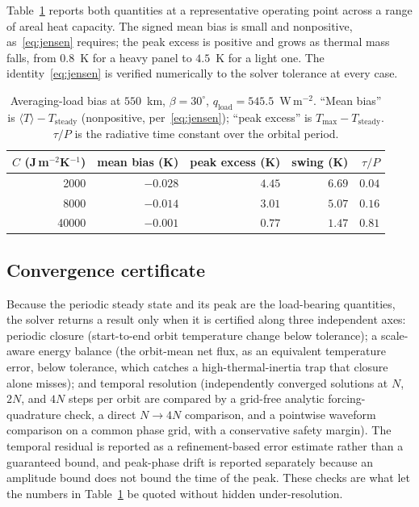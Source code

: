 \documentclass[11pt]{article}
\theoremstyle{remark}
\begin{document}
Table~\ref{tab:bias} reports both quantities at a representative operating point
across a range of areal heat capacity. The signed mean bias is small and
nonpositive, as~\eqref{eq:jensen} requires; the peak excess is positive and grows
as thermal mass falls, from $0.8$~K for a heavy panel to $4.5$~K for a light one.
The identity~\eqref{eq:jensen} is verified numerically to the solver tolerance at
every case.

\begin{table}[t]
\centering
\caption{Averaging-load bias at $550$~km, $\beta=30^{\circ}$,
$q_{\mathrm{load}}=545.5$~W\,m$^{-2}$. ``Mean bias'' is
$\langle T\rangle - T_{\mathrm{steady}}$ (nonpositive, per~\eqref{eq:jensen});
``peak excess'' is $T_{\max}-T_{\mathrm{steady}}$. $\tau/P$ is the radiative time
constant over the orbital period.}
\label{tab:bias}
\begin{tabular}{rrrrr}
\toprule
$C$ (J\,m$^{-2}$K$^{-1}$) & mean bias (K) & peak excess (K) & swing (K) & $\tau/P$ \\
\midrule
2000  & $-0.028$ & $4.45$ & $6.69$ & $0.04$ \\
8000  & $-0.014$ & $3.01$ & $5.07$ & $0.16$ \\
40000 & $-0.001$ & $0.77$ & $1.47$ & $0.81$ \\
\bottomrule
\end{tabular}
\end{table}

\subsection{Convergence certificate}

Because the periodic steady state and its peak are the load-bearing quantities,
the solver returns a result only when it is certified along three independent
axes: periodic closure (start-to-end orbit temperature change below tolerance); a
scale-aware energy balance (the orbit-mean net flux, as an equivalent temperature
error, below tolerance, which catches a high-thermal-inertia trap that closure
alone misses); and temporal resolution (independently converged solutions at $N$,
$2N$, and $4N$ steps per orbit are compared by a grid-free analytic
forcing-quadrature check, a direct $N\!\to\!4N$ comparison, and a pointwise
waveform comparison on a common phase grid, with a conservative safety margin). The
temporal residual is reported as a refinement-based error estimate rather than a
guaranteed bound, and peak-phase drift is reported separately because an amplitude
bound does not bound the time of the peak. These checks are what let the numbers in
Table~\ref{tab:bias} be quoted without hidden under-resolution.
\end{document}

